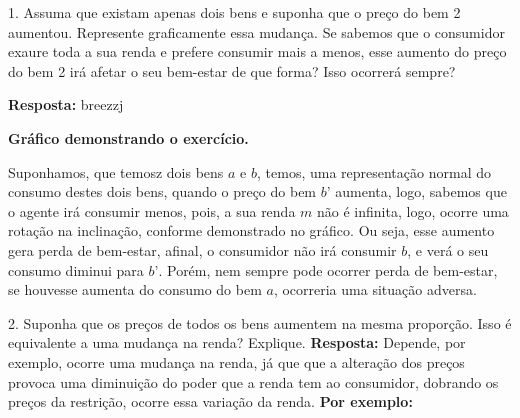 \documentclass[a4paper, 12pt]{article} %
\begin{document}
\begin{flushleft}

1. Assuma que existam apenas dois bens e suponha que o preço do bem 2 aumentou. Represente graficamente essa mudança. Se sabemos que o consumidor exaure toda a sua renda e prefere consumir mais a menos, esse aumento do preço do bem 2 irá afetar o seu bem-estar de que forma? Isso ocorrerá sempre? \singlespacing

\textbf{Resposta:} breezzj


\begin{center}
\textbf{Gráfico demonstrando o exercício.} 
\singlespacing
{}    
\singlespacing

\end{center}
Suponhamos, que temosz dois bens $\textit{a}$ e $\textit{b}$, temos, uma representação normal do consumo destes dois bens, quando o preço do bem $\textit{b'}$ aumenta, logo, sabemos que o agente irá consumir menos, pois, a sua renda $\textit{m}$ não é infinita, logo, ocorre uma rotação na inclinação, conforme demonstrado no gráfico. Ou seja, esse aumento gera perda de bem-estar, afinal, o consumidor não irá consumir $\textit{b}$, e verá o seu consumo diminui para $\textit{b'}$. Porém, nem sempre pode ocorrer perda de bem-estar, se houvesse aumenta do consumo do bem $\textit{a}$, ocorreria uma situação adversa. \singlespacing

2. Suponha que os preços de todos os bens aumentem na mesma proporção. Isso é equivalente a uma mudança na renda? Explique.
\singlespacing
\textbf{Resposta:} Depende, por exemplo, ocorre uma mudança na renda, já que que a alteração dos preços provoca uma diminuição do poder que a renda tem ao consumidor, dobrando os preços da restrição, ocorre essa variação da renda. \textbf{Por exemplo:}


\end{flushleft}
\end{document}
